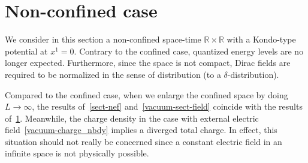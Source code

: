 \section{Non-confined case}\label{vacuum-without_bdy}
We consider in this section a non-confined space-time $\mathbb{R}\times\mathbb{R}$ with a Kondo-type potential at $x^1 = 0$.
Contrary to the confined case, quantized energy levels are no longer expected. 
Furthermore, since the space is not compact, Dirac fields are required to be normalized in the sense of distribution (to a $\delta$-distribution).  

%
Compared to the confined case, when we enlarge the confined space by doing $L \rightarrow \infty$, 
the results of~\cref{sect-nef} and~\cref{vacuum-sect-field} coincide with the results of~\cref{vacuum-without_bdy}.
Meanwhile, the charge density in the case with external electric field~\cref{vacuum-charge_nbdy} implies a diverged total charge.
In effect, this situation should not really be concerned since a constant electric field in an infinite space is not physically possible.
